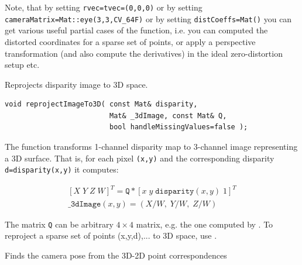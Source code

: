 Note, that by setting \texttt{rvec=tvec=(0,0,0)} or by setting \texttt{cameraMatrix=Mat::eye(3,3,CV\_64F)} or by setting \texttt{distCoeffs=Mat()} you can get various useful partial cases of the function, i.e. you can computed the distorted coordinates for a sparse set of points, or apply a perspective transformation (and also compute the derivatives) in the ideal zero-distortion setup etc.

\label{reprojectImageTo3D}
Reprojects disparity image to 3D space.

\begin{lstlisting}
void reprojectImageTo3D( const Mat& disparity,
                         Mat& _3dImage, const Mat& Q,
                         bool handleMissingValues=false );
\end{lstlisting}
\begin{description}
\end{description}
 
The function transforms 1-channel disparity map to 3-channel image representing a 3D surface. That is, for each pixel \texttt{(x,y)} and the corresponding disparity \texttt{d=disparity(x,y)} it computes: 

\[\begin{array}{l}
[X\; Y\; Z\; W]^T = \texttt{Q}*[x\; y\; \texttt{disparity}(x,y)\; 1]^T \\
\texttt{\_3dImage}(x,y) = (X/W,\; Y/W,\; Z/W)
\end{array}\]

The matrix \texttt{Q} can be arbitrary $4 \times 4$ matrix, e.g. the one computed by . To reproject a sparse set of points {(x,y,d),...} to 3D space, use .  


\label{solvePnP}
Finds the camera pose from the 3D-2D point correspondences

